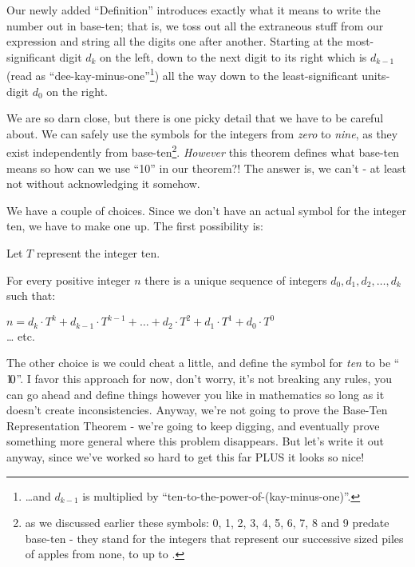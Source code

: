 \documentclass{article}
\newenvironment{jprIn}{\begin{adjustwidth}{2em}{}}{\end{adjustwidth}}
\begin{document}
Our newly added ``Definition'' introduces exactly what it means to write
the number out in base-ten; that is,
we toss out all the extraneous stuff from our expression
and string all the digits one after another.
Starting at the most-significant digit $d_k$ on the left,
down to the next digit to its right which is $d_{k-1}$
(read as ``dee-kay-minus-one''\footnote{\dots{}and $d_{k-1}$ is
multiplied by ``ten-to-the-power-of-(kay-minus-one)''.})
all the way down to the least-significant units-digit $d_0$ on the right.

We are so darn close, but there is one picky detail that we have to be careful about.
We can safely use the symbols for the integers from \emph{zero} to \emph{nine},
as they exist independently from base-ten\footnote{as we discussed earlier
these symbols: 0, 1, 2, 3, 4, 5, 6, 7, 8 and 9 predate base-ten - they
stand for the integers that represent our successive
sized piles of apples from none, to \faApple{} up
to \faApple{}\faApple{}\faApple{}\faApple{}\faApple{}\faApple{}\faApple{}\faApple{}\faApple{}.}.
\emph{However} this theorem defines what base-ten means so how can we
use ``10'' in our theorem?!  The answer is, we can't - at 
least not without acknowledging it somehow.

We have a couple of choices.
Since we don't have an actual symbol for the integer ten,
we have to make one up. The first possibility is:
\begin{jprIn}
Let $T$ represent the integer ten.

For every positive integer $n$ there is a unique sequence
of integers $d_0, d_1, d_2,\dots{},d_k$ such that:

\hspace{3em}$n=d_k{\cdot}{T}^k+d_{k-1}{\cdot}{T}^{k-1}+\dots+d_2{\cdot}{T}^2+d_1{\cdot}{T}^1+d_0{\cdot}{T}^0$\\
\dots{} etc.
\end{jprIn}

The other choice is we could cheat a little,
and define the symbol for \emph{ten} to be ``$1\hspace{-0.2em}0$''.
I favor this approach for now, don't worry, it's not breaking any rules,
you can go ahead and define things
however you like in mathematics so long as it doesn't create inconsistencies.
Anyway, we're not going
to prove the Base-Ten Representation Theorem - we're going to keep digging,
and eventually prove something more general where this problem disappears.
But let's write it out anyway, since we've worked so hard to get this far PLUS
it looks so nice!
\end{document}
